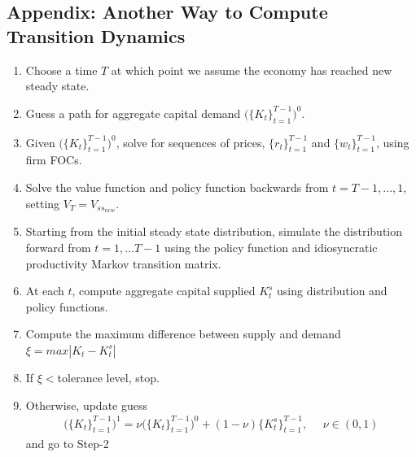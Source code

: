 \documentclass{article}
\begin{document}
\begin{spacing}{1.5}
\section*{Appendix: Another Way to Compute Transition Dynamics}
\setlength{\parindent}{2em}
\begin{enumerate}
\item Choose a time $T$ at which point we assume the economy has reached new steady state.
\item Guess a path for aggregate capital demand $\Big(\{K_t\}_{t=1}^{T-1}\Big)^0$. 
\item Given $\Big(\{K_t\}_{t=1}^{T-1}\Big)^0$, solve for sequences of prices, $\{r_t\}_{t=1}^{T-1}$ and $\{w_t\}_{t=1}^{T-1}$, using firm FOCs.
\item Solve the value function and policy function backwards from $t=T-1,...,1$, setting $V_T=V_{ss_{new}}$.
\item Starting from the initial steady state distribution, simulate the distribution forward from $t=1,...T-1$ using the policy function and idiosyncratic productivity Markov transition matrix.
\item At each $t$, compute aggregate capital supplied $K^s_t$ using distribution and policy functions.
\item Compute the maximum difference between supply and demand $\xi=max|K_t-K^s_t|$
\item If $\xi<$tolerance level, stop.
\item Otherwise, update guess
\begin{align*}
\Big(\{K_t\}_{t=1}^{T-1}\Big)^1=\nu\Big(\{K_t\}_{t=1}^{T-1}\Big)^0+(1-\nu)\{K_t^s\}_{t=1}^{T-1}, \ \ \ \ \ \ \nu\in(0,1)
\end{align*}
and go to Step-2
\end{enumerate}














\end{spacing}
\end{document}
